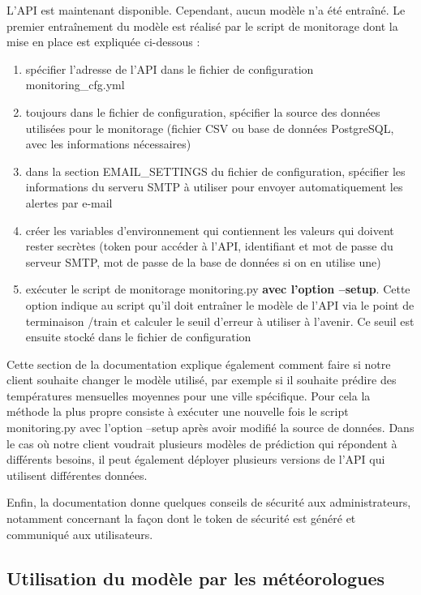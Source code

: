 \documentclass[french]{article}
\begin{document}
    L'API est maintenant disponible. Cependant, aucun modèle n'a été entraîné. Le premier entraînement du modèle est réalisé par le script de monitorage dont la mise en place est expliquée ci-dessous :
    \begin{enumerate}
        \item spécifier l'adresse de l'API dans le fichier de configuration monitoring\_cfg.yml
        \item toujours dans le fichier de configuration, spécifier la source des données utilisées pour le monitorage (fichier CSV ou base de données PostgreSQL, avec les informations nécessaires)
        \item dans la section EMAIL\_SETTINGS du fichier de configuration, spécifier les informations du serveru SMTP à utiliser pour envoyer automatiquement les alertes par e-mail
        \item créer les variables d'environnement qui contiennent les valeurs qui doivent rester secrètes (token pour accéder à l'API, identifiant et mot de passe du serveur SMTP, mot de passe de la base de données si on en utilise une)
        \item exécuter le script de monitorage monitoring.py \textbf{avec l'option --setup}. Cette option indique au script qu'il doit entraîner le modèle de l'API via le point de terminaison /train et calculer le seuil d'erreur à utiliser à l'avenir. Ce seuil est ensuite stocké dans le fichier de configuration
    \end{enumerate}

    Cette section de la documentation explique également comment faire si notre client souhaite changer le modèle utilisé, par exemple si il souhaite prédire des températures mensuelles moyennes pour une ville spécifique. Pour cela la méthode la plus propre consiste à exécuter une nouvelle fois le script monitoring.py avec l'option --setup après avoir modifié la source de données. Dans le cas où notre client voudrait plusieurs modèles de prédiction qui répondent à différents besoins, il peut également déployer plusieurs versions de l'API qui utilisent différentes données.

    Enfin, la documentation donne quelques conseils de sécurité aux administrateurs, notamment concernant la façon dont le token de sécurité est généré et communiqué aux utilisateurs.

    \subsection{Utilisation du modèle par les météorologues}
\end{document}
